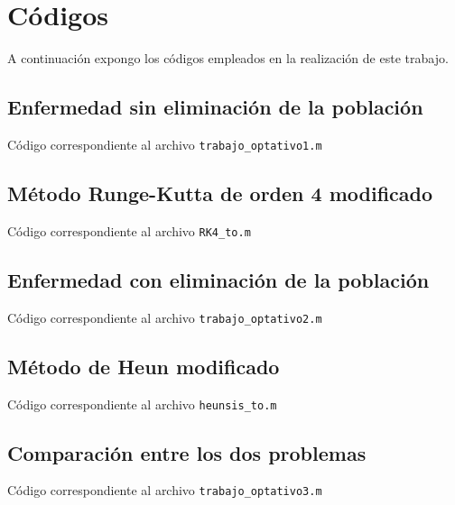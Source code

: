 \documentclass[a4paper,11pt]{article}
\numberwithin{equation}{section}
\begin{document}
\section{Códigos}
\indent A continuación expongo los códigos empleados en la realización de este trabajo.

\subsection{Enfermedad sin eliminación de la población}
\indent Código correspondiente al archivo \texttt{trabajo\_optativo1.m}


\newpage
\subsection{Método Runge-Kutta de orden 4 modificado}
\indent Código correspondiente al archivo \texttt{RK4\_to.m}


\subsection{Enfermedad con eliminación de la población}
\indent Código correspondiente al archivo \texttt{trabajo\_optativo2.m}


\subsection{Método de Heun modificado}
\indent Código correspondiente al archivo \texttt{heunsis\_to.m}


\subsection{Comparación entre los dos problemas}
\indent Código correspondiente al archivo \texttt{trabajo\_optativo3.m}

\end{document}

